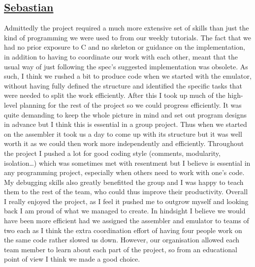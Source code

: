 \documentclass[10pt]{article}
\begin{document}
\subsection*{\underline{Sebastian}}
Admittedly the project required a much more extensive set of skills than just the kind of programming we were used to from our weekly tutorials. The fact that we had no prior exposure to C and no skeleton or guidance on the implementation, in addition to having to coordinate our work with each other, meant that the usual way of just following the spec's suggested implementation was obsolete. As such, I think we rushed a bit to produce code when we started with the emulator, without having fully defined the structure and identified the specific tasks that were needed to split the work efficiently. After this I took up much of the high-level planning for the rest of the project so we could progress efficiently. It was quite demanding to keep the whole picture in mind and set out program designs in advance but I think this is essential in a group project. Thus when we started on the assembler it took us a day to come up with its structure but it was well worth it as we could then work more independently and efficiently. \newline
\hspace*{0.6cm}Throughout the project I pushed a lot for good coding style (comments, modularity, isolation…) which was sometimes met with resentment but I believe is essential in any programming project, especially when others need to work with one’s code. My debugging skills also greatly benefitted the group and I was happy to teach them to the rest of the team, who could thus improve their productivity.
Overall I really enjoyed the project, as I feel it pushed me to outgrow myself and looking back I am proud of what we managed to create. In hindsight I believe we would have been more efficient had we assigned the assembler and emulator to teams of two each as I think the extra coordination effort of having four people work on the same code rather slowed us down. However, our organisation allowed each team member to learn about each part of the project, so from an educational point of view I think we made a good choice.
\newline
\end{document}
